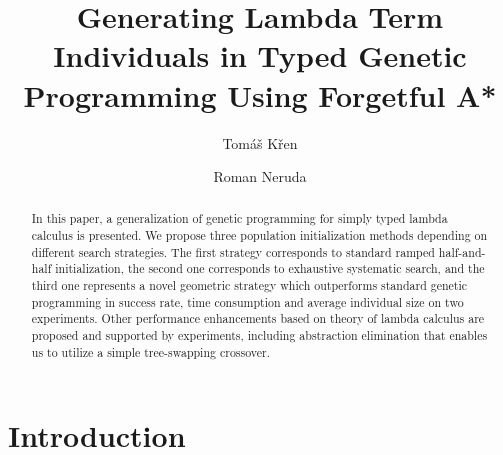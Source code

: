 \documentclass{llncs}
\begin{document}
\title{
Generating Lambda Term Individuals in Typed Genetic Programming Using 
Forgetful A*}
\author{Tom\'{a}\v{s} K\v{r}en \and Roman Neruda}
\maketitle

\begin{abstract}
In this paper, a generalization of genetic programming 
for simply typed lambda calculus is presented. We propose three population 
initialization methods depending on different search strategies. 
The first strategy corresponds to standard ramped half-and-half initialization, 
the second one corresponds to exhaustive systematic search, and the third one 
represents a novel geometric strategy which outperforms standard genetic 
programming in success rate, time consumption and average individual size 
on two experiments. 
Other performance enhancements based on theory of lambda calculus are 
proposed and supported by experiments, including abstraction elimination 
that enables us to utilize a simple tree-swapping crossover.
\end{abstract}


\section{Introduction}


\end{document}
